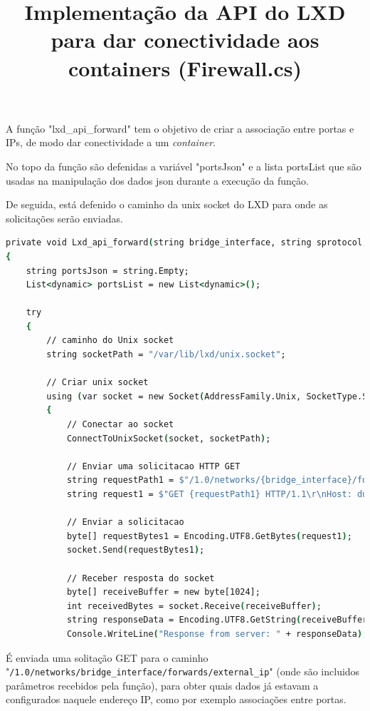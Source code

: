 \title*{\textbf{Implementação da API do LXD para dar conectividade aos containers (Firewall.cs)}}


A função "lxd\_api\_forward" tem o objetivo de criar a associação entre portas e
IPs, de modo dar conectividade a um \textit{container}.

No topo da função são defenidas a variável "portsJson" e a lista portsList que são usadas
na manipulação dos dados json durante a execução da função.

De seguida, está defenido o caminho da unix socket do LXD para onde as solicitações
serão enviadas.

\begin{lstlisting}[language=csh, caption={Função que cria uma associação de ip e portas para um container}]
private void Lxd_api_forward(string bridge_interface, string sprotocol,string port, string external_ip, string cont_internal_ip, string cont_internal_port) //criar comandos de forward
{
    string portsJson = string.Empty;
    List<dynamic> portsList = new List<dynamic>();

    try
    {
        // caminho do Unix socket
        string socketPath = "/var/lib/lxd/unix.socket";

        // Criar unix socket
        using (var socket = new Socket(AddressFamily.Unix, SocketType.Stream, ProtocolType.Unspecified))
        {
            // Conectar ao socket
            ConnectToUnixSocket(socket, socketPath);

            // Enviar uma solicitacao HTTP GET
            string requestPath1 = $"/1.0/networks/{bridge_interface}/forwards/{external_ip}";
            string request1 = $"GET {requestPath1} HTTP/1.1\r\nHost: dummy\r\n\r\n";

            // Enviar a solicitacao
            byte[] requestBytes1 = Encoding.UTF8.GetBytes(request1);
            socket.Send(requestBytes1);

            // Receber resposta do socket
            byte[] receiveBuffer = new byte[1024];
            int receivedBytes = socket.Receive(receiveBuffer);
            string responseData = Encoding.UTF8.GetString(receiveBuffer, 0, receivedBytes);
            Console.WriteLine("Response from server: " + responseData);


\end{lstlisting} 

É enviada uma solitação GET para o caminho \\
"\texttt{/1.0/networks/{bridge\_interface}/forwards/{external\_ip}}"
(onde são incluidos parâmetros recebidos pela função), para obter quais dados já estavam 
a configurados naquele endereço IP, como por exemplo associações entre portas. \\

